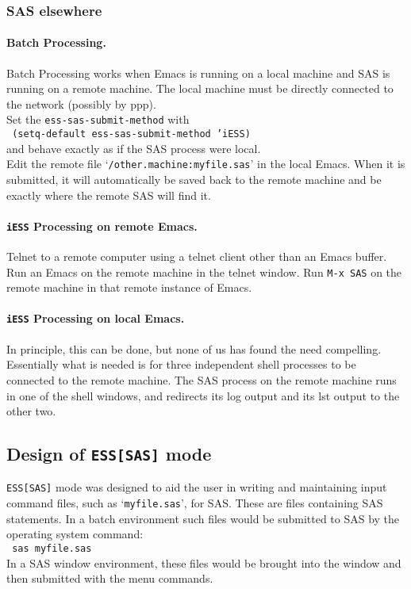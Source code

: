 \documentclass{article}
\newcommand{\stexttt}[1]{{\small\texttt{#1}}}
\newcommand{\ssf}[1]{{\small\sf{#1}}}
\newcommand{\elcode}[1]{\\{\stexttt{\hspace*{2em} #1}}\\}
\newcommand{\file}[1]{`\stexttt{#1}'}
\begin{document}
\subsubsection{SAS elsewhere}

\paragraph{Batch Processing.}
Batch Processing works when Emacs is running on a local machine and SAS
is running on a remote machine.  The local machine must be directly
connected to the network (possibly by ppp).\\
Set the \stexttt{ess-sas-submit-method} with
\elcode{(setq-default ess-sas-submit-method 'iESS)}
and behave exactly as if the SAS process were local.\\
Edit the remote file
\file{/other.machine:myfile.sas}
in the local Emacs.
When it is submitted, it will automatically be saved back to the remote
machine and be exactly where the remote SAS will find it.

\paragraph{\stexttt{iESS} Processing on remote Emacs.}
Telnet to a remote computer using a telnet client other than an Emacs buffer.
Run an Emacs on the remote machine in the telnet window.
Run \stexttt{M-x SAS} on the remote machine in that remote instance of Emacs.

\paragraph{\stexttt{iESS} Processing on local Emacs.}
In principle, this can be done, but none of us has found the need
compelling.  Essentially what is needed is for three independent shell
processes to be connected to the remote machine.  The SAS process on
the remote machine runs in one of the shell windows, and redirects its
log output and its lst output to the other two.


\subsection{Design of \texttt{ESS[SAS]} mode}
\label{sec:SAS:phil}

\stexttt{ESS[SAS]} mode was designed to aid the user in writing and maintaining
input command files, such as \file{myfile.sas}, for SAS.  These are files
containing SAS statements.  In a batch environment such files would be
submitted to SAS by the operating system command:
\elcode{sas myfile.sas}
In a SAS window environment, these files would be brought into the
\ssf{SAS: PROGRAM EDITOR} window and then submitted with the
\ssf{Local/Submit}
menu commands.
\end{document}
